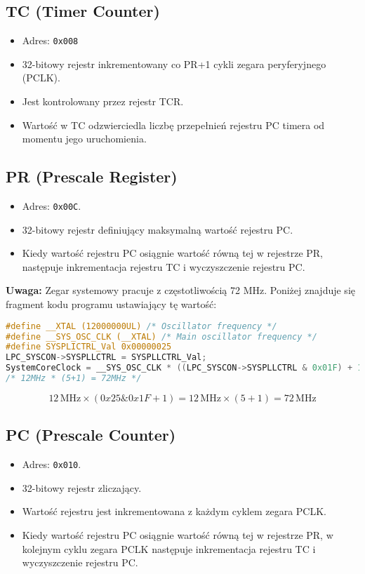 \documentclass[letterpaper,11pt]{report}
\begin{document}
\subsection{TC (Timer Counter)}
\begin{itemize}
    \item Adres: \texttt{0x008}
    \item 32-bitowy rejestr inkrementowany co PR+1 cykli zegara peryferyjnego (PCLK).
    \item Jest kontrolowany przez rejestr TCR.
    \item Wartość w TC odzwierciedla liczbę przepełnień rejestru PC timera od momentu jego uruchomienia.
\end{itemize}

\subsection{PR (Prescale Register)}
\begin{itemize}
    \item Adres: \texttt{0x00C}.
    \item 32-bitowy rejestr definiujący maksymalną wartość rejestru PC.
    \item Kiedy wartość rejestru PC osiągnie wartość równą tej w rejestrze PR, następuje inkrementacja rejestru TC i wyczyszczenie rejestru PC.
\end{itemize}

\textbf{Uwaga:} Zegar systemowy pracuje z częstotliwością 72 MHz. Poniżej znajduje się fragment kodu programu ustawiający tę wartość:
\begin{lstlisting}[language=C]
#define __XTAL (12000000UL) /* Oscillator frequency */
#define __SYS_OSC_CLK (__XTAL) /* Main oscillator frequency */
#define SYSPLICTRL_Val 0x00000025
LPC_SYSCON->SYSPLLCTRL = SYSPLLCTRL_Val;
SystemCoreClock = __SYS_OSC_CLK * ((LPC_SYSCON->SYSPLLCTRL & 0x01F) + 1);
/* 12MHz * (5+1) = 72MHz */
\end{lstlisting}

\[
12\,\mathrm{MHz} \times (0x25 \& 0x1F + 1) = 12\,\mathrm{MHz} \times (5+1) = 72\,\mathrm{MHz}
\]

\subsection{PC (Prescale Counter)}
\begin{itemize}
    \item Adres: \texttt{0x010}.
    \item 32-bitowy rejestr zliczający.
    \item Wartość rejestru jest inkrementowana z każdym cyklem zegara PCLK.
    \item Kiedy wartość rejestru PC osiągnie wartość równą tej w rejestrze PR, w kolejnym cyklu zegara PCLK następuje inkrementacja rejestru TC i wyczyszczenie rejestru PC.
\end{itemize}
\end{document}
